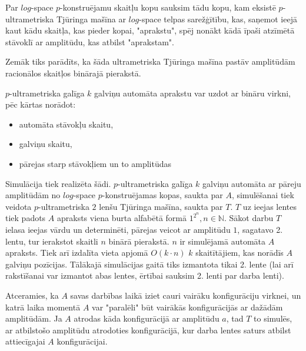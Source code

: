 \documentclass{ludis}
\begin{document}
\begin{definicija}
Par $log$-space $p$-konstruējamu skaitļu kopu sauksim tādu kopu, kam eksistē $p$-ultrametriska Tjūringa mašīna ar $log$-space telpas sarežģītību, kas, saņemot ieejā kaut kādu skaitļa, kas pieder kopai, "aprakstu", spēj nonākt kādā īpaši atzīmētā stāvoklī ar amplitūdu, kas atbilst "aprakstam".
\end{definicija}

Zemāk tiks parādīts, ka šāda ultrametriska Tjūringa mašīna pastāv amplitūdām racionālos skaitļos binārajā pierakstā.

$p$-ultrametriska galīga $k$ galviņu automāta aprakstu var uzdot ar bināru virkni, pēc kārtas norādot:
\begin{itemize}
	\item automāta stāvokļu skaitu,
	\item galviņu skaitu,
	\item pārejas starp stāvokļiem un to amplitūdas %
\end{itemize}

Simulācija tiek realizēta šādi. $p$-ultrametriska galīga $k$ galviņu automāta ar pāreju amplitūdām no $log$-space $p$-konstruējamas kopas, saukta par $A$, simulēšanai tiek veidota $p$-ultrametriska $2$ lenšu Tjūringa mašīna, saukta par $T$. $T$ uz ieejas lentes tiek padots $A$ apraksts viena burta alfabētā formā $1^{2^n}, n \in \mathbb{N}$. Sākot darbu $T$ ielasa ieejas vārdu un determinēti, pārejas veicot ar amplitūdu $1$, sagatavo 2. lentu, tur ierakstot skaitli $n$ binārā pierakstā. $n$ ir simulējamā automāta $A$ apraksts. Tiek arī izdalīta vieta apjomā $O(k \cdot n)$ $k$ skaitītājiem, kas norādīs $A$ galviņu pozīcijas. Tālākajā simulācijas gaitā tiks izmantota tikai 2. lente (lai arī rakstīšanai var izmantot abas lentes, ērtībai sauksim 2. lenti par darba lenti).

Atceramies, ka $A$ savas darbības laikā iziet cauri vairāku konfigurāciju virknei, un katrā laika momentā $A$ var "paralēli" būt vairākās konfigurācijās ar dažādām amplitūdām.
Ja $A$ atrodas kāda konfigurācijā ar amplitūdu $a$, tad $T$ to simulēs, ar atbilstošo amplitūdu atrodoties konfigurācijā, kur darba lentes saturs atbilst attiecīgajai $A$ konfigurācijai.
\end{document}
